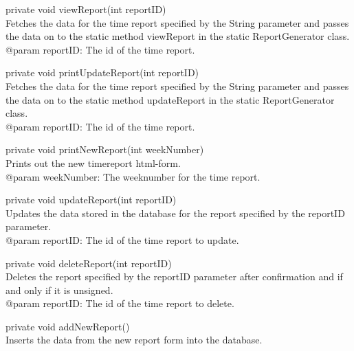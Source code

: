 \documentclass[a4paper]{article}
\begin{document}
\vspace{5mm}
\begin{hangparas}{1.5em}{1}
private void viewReport(int reportID)\\
Fetches the data for the time report specified by the String parameter and passes the data on to the static method viewReport in the static ReportGenerator class.\\
@param reportID: The id of the time report.
\end{hangparas}

\vspace{5mm}
\begin{hangparas}{1.5em}{1}
private void printUpdateReport(int reportID)\\
Fetches the data for the time report specified by the String parameter and passes the data on to the static method updateReport in the static ReportGenerator class.\\
@param reportID: The id of the time report.
\end{hangparas}

\vspace{5mm}
\begin{hangparas}{1.5em}{1}
private void printNewReport(int weekNumber)\\
Prints out the new timereport html-form.\\
@param weekNumber: The weeknumber for the time report.
\end{hangparas}

\vspace{5mm}
\begin{hangparas}{1.5em}{1}
private void updateReport(int reportID)\\
Updates the data stored in the database for the report specified by the reportID parameter.\\
@param reportID: The id of the time report to update. 
\end{hangparas}

\vspace{5mm}
\begin{hangparas}{1.5em}{1}
private void deleteReport(int reportID)\\
Deletes the report specified by the reportID parameter after confirmation and if and only if it is unsigned.\\
@param reportID: The id of the time report to delete.
\end{hangparas}

\vspace{5mm}
\begin{hangparas}{1.5em}{1}
private void addNewReport()\\
Inserts the data from the new report form into the database.
\end{hangparas}
\end{document}

